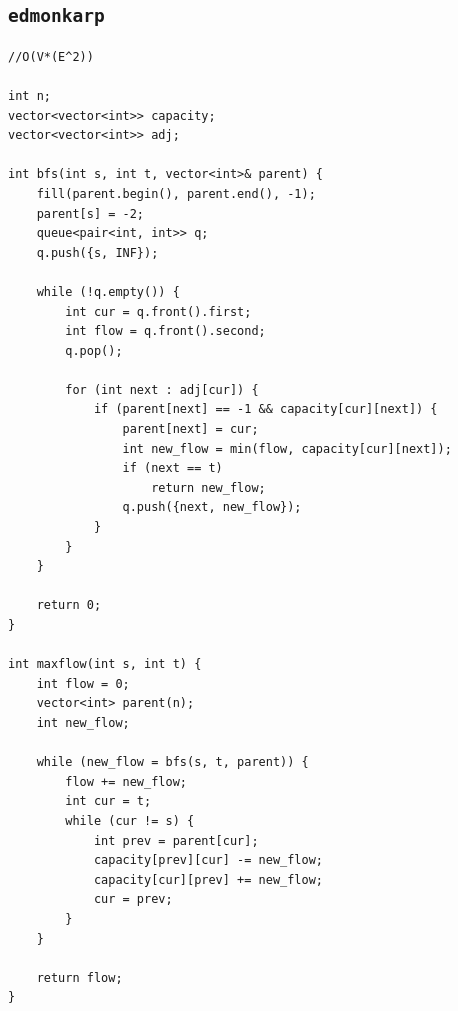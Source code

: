 \subsection{\texttt{edmonkarp}}
\begin{lstlisting}
//O(V*(E^2))

int n;
vector<vector<int>> capacity;
vector<vector<int>> adj;

int bfs(int s, int t, vector<int>& parent) {
    fill(parent.begin(), parent.end(), -1);
    parent[s] = -2;
    queue<pair<int, int>> q;
    q.push({s, INF});

    while (!q.empty()) {
        int cur = q.front().first;
        int flow = q.front().second;
        q.pop();

        for (int next : adj[cur]) {
            if (parent[next] == -1 && capacity[cur][next]) {
                parent[next] = cur;
                int new_flow = min(flow, capacity[cur][next]);
                if (next == t)
                    return new_flow;
                q.push({next, new_flow});
            }
        }
    }

    return 0;
}

int maxflow(int s, int t) {
    int flow = 0;
    vector<int> parent(n);
    int new_flow;

    while (new_flow = bfs(s, t, parent)) {
        flow += new_flow;
        int cur = t;
        while (cur != s) {
            int prev = parent[cur];
            capacity[prev][cur] -= new_flow;
            capacity[cur][prev] += new_flow;
            cur = prev;
        }
    }

    return flow;
}\end{lstlisting}

